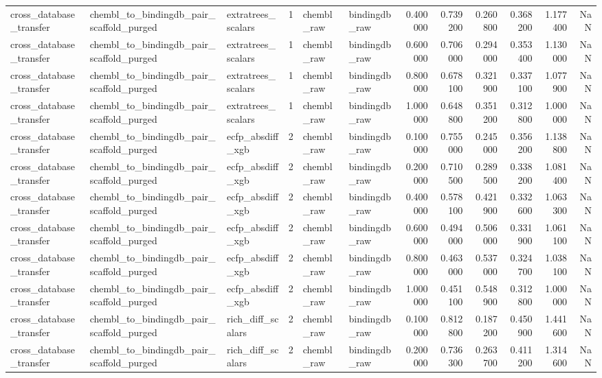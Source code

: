 \begin{longtable}{lllrllrrrrrr}
cross\_database\_transfer & chembl\_to\_bindingdb\_pair\_scaffold\_purged & extratrees\_scalars & 1 & chembl\_raw & bindingdb\_raw & 0.400000 & 0.739200 & 0.260800 & 0.368200 & 1.177400 & NaN \\
cross\_database\_transfer & chembl\_to\_bindingdb\_pair\_scaffold\_purged & extratrees\_scalars & 1 & chembl\_raw & bindingdb\_raw & 0.600000 & 0.706000 & 0.294000 & 0.353400 & 1.130000 & NaN \\
cross\_database\_transfer & chembl\_to\_bindingdb\_pair\_scaffold\_purged & extratrees\_scalars & 1 & chembl\_raw & bindingdb\_raw & 0.800000 & 0.678100 & 0.321900 & 0.337100 & 1.077900 & NaN \\
cross\_database\_transfer & chembl\_to\_bindingdb\_pair\_scaffold\_purged & extratrees\_scalars & 1 & chembl\_raw & bindingdb\_raw & 1.000000 & 0.648800 & 0.351200 & 0.312800 & 1.000000 & NaN \\
cross\_database\_transfer & chembl\_to\_bindingdb\_pair\_scaffold\_purged & ecfp\_absdiff\_xgb & 2 & chembl\_raw & bindingdb\_raw & 0.100000 & 0.755000 & 0.245000 & 0.356200 & 1.138800 & NaN \\
cross\_database\_transfer & chembl\_to\_bindingdb\_pair\_scaffold\_purged & ecfp\_absdiff\_xgb & 2 & chembl\_raw & bindingdb\_raw & 0.200000 & 0.710500 & 0.289500 & 0.338200 & 1.081400 & NaN \\
cross\_database\_transfer & chembl\_to\_bindingdb\_pair\_scaffold\_purged & ecfp\_absdiff\_xgb & 2 & chembl\_raw & bindingdb\_raw & 0.400000 & 0.578100 & 0.421900 & 0.332600 & 1.063300 & NaN \\
cross\_database\_transfer & chembl\_to\_bindingdb\_pair\_scaffold\_purged & ecfp\_absdiff\_xgb & 2 & chembl\_raw & bindingdb\_raw & 0.600000 & 0.494000 & 0.506000 & 0.331900 & 1.061100 & NaN \\
cross\_database\_transfer & chembl\_to\_bindingdb\_pair\_scaffold\_purged & ecfp\_absdiff\_xgb & 2 & chembl\_raw & bindingdb\_raw & 0.800000 & 0.463000 & 0.537000 & 0.324700 & 1.038100 & NaN \\
cross\_database\_transfer & chembl\_to\_bindingdb\_pair\_scaffold\_purged & ecfp\_absdiff\_xgb & 2 & chembl\_raw & bindingdb\_raw & 1.000000 & 0.451100 & 0.548900 & 0.312800 & 1.000000 & NaN \\
cross\_database\_transfer & chembl\_to\_bindingdb\_pair\_scaffold\_purged & rich\_diff\_scalars & 2 & chembl\_raw & bindingdb\_raw & 0.100000 & 0.812800 & 0.187200 & 0.450900 & 1.441600 & NaN \\
cross\_database\_transfer & chembl\_to\_bindingdb\_pair\_scaffold\_purged & rich\_diff\_scalars & 2 & chembl\_raw & bindingdb\_raw & 0.200000 & 0.736300 & 0.263700 & 0.411200 & 1.314600 & NaN \\

\end{longtable}
